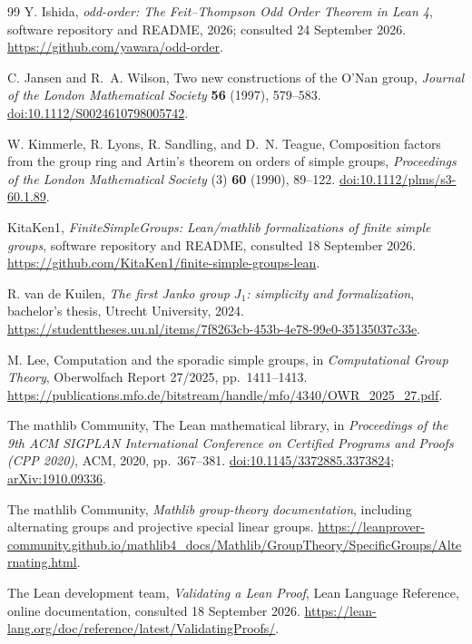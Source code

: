 \documentclass[11pt]{article}
\numberwithin{equation}{section}
\theoremstyle{definition}
\begin{document}
\begin{thebibliography}{99}
Y. Ishida,
\emph{odd-order: The Feit--Thompson Odd Order Theorem in Lean 4},
software repository and README, 2026; consulted 24 September 2026.
\url{https://github.com/yawara/odd-order}.

C. Jansen and R.~A. Wilson, Two new constructions of the O'Nan group,
\emph{Journal of the London Mathematical Society} \textbf{56} (1997),
579--583.
\href{https://doi.org/10.1112/S0024610798005742}{doi:10.1112/S0024610798005742}.

W. Kimmerle, R. Lyons, R. Sandling, and D.~N. Teague,
Composition factors from the group ring and Artin's theorem on orders
of simple groups, \emph{Proceedings of the London Mathematical Society}
(3) \textbf{60} (1990), 89--122.
\href{https://doi.org/10.1112/plms/s3-60.1.89}{doi:10.1112/plms/s3-60.1.89}.

KitaKen1,
\emph{FiniteSimpleGroups: Lean/mathlib formalizations of finite simple
groups}, software repository and README, consulted 18 September 2026.
\url{https://github.com/KitaKen1/finite-simple-groups-lean}.

R. van de Kuilen, \emph{The first Janko group $J_1$: simplicity and
formalization}, bachelor's thesis, Utrecht University, 2024.
\url{https://studenttheses.uu.nl/items/7f8263cb-453b-4e78-99e0-35135037c33e}.

M. Lee, Computation and the sporadic simple groups,
in \emph{Computational Group Theory}, Oberwolfach Report 27/2025,
pp.~1411--1413.
\url{https://publications.mfo.de/bitstream/handle/mfo/4340/OWR_2025_27.pdf}.

The mathlib Community,
The Lean mathematical library,
in \emph{Proceedings of the 9th ACM SIGPLAN International Conference
on Certified Programs and Proofs (CPP 2020)}, ACM, 2020,
pp.~367--381.
\href{https://doi.org/10.1145/3372885.3373824}{doi:10.1145/3372885.3373824};
\href{https://arxiv.org/abs/1910.09336}{arXiv:1910.09336}.

The mathlib Community, \emph{Mathlib group-theory documentation},
including alternating groups and projective special linear groups.
\url{https://leanprover-community.github.io/mathlib4_docs/Mathlib/GroupTheory/SpecificGroups/Alternating.html}.

The Lean development team,
\emph{Validating a Lean Proof}, Lean Language Reference,
online documentation, consulted 18 September 2026.
\url{https://lean-lang.org/doc/reference/latest/ValidatingProofs/}.


\end{thebibliography}
\end{document}
